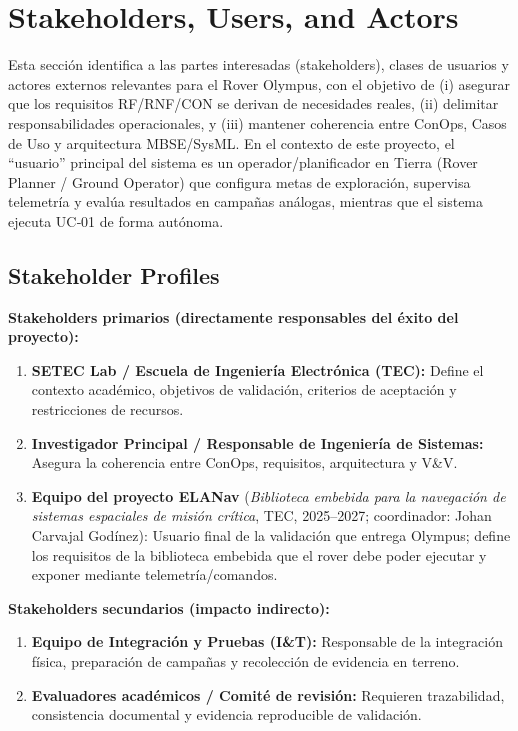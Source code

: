 
\section{Stakeholders, Users, and Actors}

Esta sección identifica a las partes interesadas (stakeholders), clases de usuarios y actores externos relevantes para el Rover Olympus, con el objetivo de (i) asegurar que los requisitos RF/RNF/CON se derivan de necesidades reales, (ii) delimitar responsabilidades operacionales, y (iii) mantener coherencia entre ConOps, Casos de Uso y arquitectura MBSE/SysML.
En el contexto de este proyecto, el ``usuario'' principal del sistema es un operador/planificador en Tierra (Rover Planner / Ground Operator) que configura metas de exploración, supervisa telemetría y evalúa resultados en campañas análogas, mientras que el sistema ejecuta UC‑01 de forma autónoma.

\subsection{Stakeholder Profiles}

\textbf{Stakeholders primarios (directamente responsables del éxito del proyecto):}
\begin{enumerate}
    \item \textbf{SETEC Lab / Escuela de Ingeniería Electrónica (TEC):} Define el contexto académico, objetivos de validación, criterios de aceptación y restricciones de recursos.
    \item \textbf{Investigador Principal / Responsable de Ingeniería de Sistemas:} Asegura la coherencia entre ConOps, requisitos, arquitectura y V\&V.
    \item \textbf{Equipo del proyecto ELANav} (\emph{Biblioteca embebida para la navegación de sistemas espaciales de misión crítica}, TEC, 2025--2027; coordinador: Johan Carvajal Godínez): Usuario final de la validación que entrega Olympus; define los requisitos de la biblioteca embebida que el rover debe poder ejecutar y exponer mediante telemetría/comandos.
\end{enumerate}

\textbf{Stakeholders secundarios (impacto indirecto):}
\begin{enumerate}[resume]
    \item \textbf{Equipo de Integración y Pruebas (I\&T):} Responsable de la integración física, preparación de campañas y recolección de evidencia en terreno.
    \item \textbf{Evaluadores académicos / Comité de revisión:} Requieren trazabilidad, consistencia documental y evidencia reproducible de validación.
\end{enumerate}

